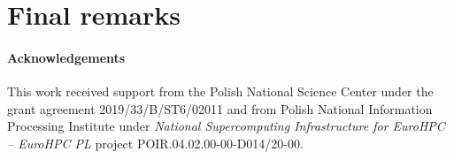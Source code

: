 \documentclass[a4paper,11pt]{article}
\begin{document}
\section{Final remarks}



\paragraph{Acknowledgements}
This work received support from the Polish National Science Center under the grant agreement 2019/33/B/ST6/02011 and from Polish National Information Processing Institute  under \emph{National Supercomputing Infrastructure for EuroHPC -- EuroHPC PL} project POIR.04.02.00-00-D014/20-00.



\end{document}
